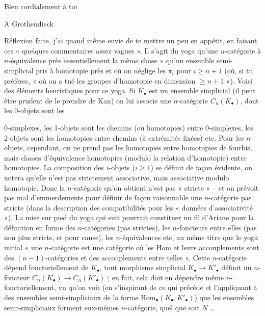 \documentclass[11pt,a4paper]{article}
\begin{document}
Bien cordialement à toi

A Grothendieck

 Réflexion faite, j'ai quand même envie de te mettre un peu en appétit, en faisant ces « quelques commentaires assez vagues ». Il s'agit du yoga qu'une  $n$-catégorie  à $n$-équivalence près \struck{\ill{}}  essentiellement la même chose » qu'un ensemble semi-simplicial pris à homotopie près et où on néglige les $\pi_i$ pour $i \geqslant n+1$ (où, si tu préfères, « où on a tué les groupes d'homotopie en dimension $\geqslant n+1$ »). Voici des éléments heuristiques pour ce yoga. Si $K_\bullet$ est un ensemble simplicial (il peut être prudent de le prendre de Kan) on lui associe une $n$-catégorie $C_n(K_\bullet)$, dont les 0-objets sont les

0-simplexes, les 1-objets sont les chemins (ou homotopies) entre 0-simplexes, les 2-objets sont les homotopies entre chemins (à extrémités fixées) etc. Pour les $n$-objets, cependant, on ne prend pas les homotopies entre homotopies de fourbis, mais classes d'équivalence \struck{\ill{}} homotopies (modulo la relation d'homotopie) entre homotopies. La composition des $i$-objets ($i \geqslant 1$) se définit de façon évidente, on notera qu'elle n'est pas strictement associative, mais associative modulo homotopie. Donc la $n$-catégorie qu'on obtient n'est pas « stricte » -- et on prévoit pas mal d'emmerdements pour définir de façon raisonnable une $n$-catégorie pas stricte (dans la description des compatibilités pour les « données d'associativité »). La mise sur pied du yoga qui suit pourrait constituer un fil d'Ariane pour la définition en forme des $n$-catégories (pas strictes), les $n$-foncteurs entre elles (pas non plus stricts, et pour cause), les $n$-équivalences etc, au même titre que le yoga initial « une $n$-catégorie est une catégorie où les Hom et leurs accouplements  sont des $(n-1)$-catégories et des accouplements entre telles ». Cette $n$-catégorie  dépend fonctoriellement de $K_\bullet$, tout morphisme simplicial $K_\bullet \to K'_\bullet$ définit un $n$-foncteur $C_n(K_\bullet) \to C_n(K'_\bullet)$ ; en fait, cela doit en dépendre même $n$-fonctoriellement, vu qu'on voit (en s'inspirant de ce qui précède et l'appliquant à des ensembles semi-simpliciaux de la forme $\mathrm{Hom}_\bullet(K_\bullet, K'_\bullet)$) que les ensembles semi-simpliciaux forment eux-mêmes  $n$-catégorie, quel que soit $N$ …
\end{document}
